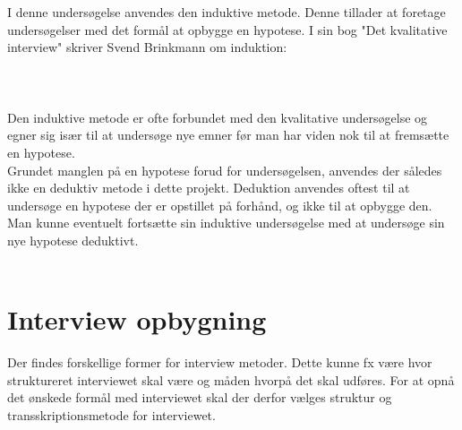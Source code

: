\\
\\ 
I denne undersøgelse anvendes den induktive metode. Denne tillader at foretage undersøgelser med det formål at opbygge en hypotese. 
I sin bog "Det kvalitative interview" skriver Svend Brinkmann om induktion:
\\
\\
 \citep{brinkmann2014}
\\
\\
Den induktive metode er ofte forbundet med den kvalitative undersøgelse og egner sig især til at undersøge nye emner før man har viden nok til at fremsætte en hypotese. 
\\
Grundet manglen på en hypotese forud for undersøgelsen, anvendes der således ikke en deduktiv metode i dette projekt. Deduktion anvendes oftest til at undersøge en hypotese der er opstillet på forhånd, og ikke til at opbygge den. Man kunne eventuelt fortsætte sin induktive undersøgelse med at undersøge sin nye hypotese deduktivt. 
\\
\\



\section{Interview opbygning}
Der findes forskellige former for interview metoder. Dette kunne fx være hvor struktureret interviewet skal være og måden hvorpå det skal udføres. For at opnå det ønskede formål med interviewet skal der derfor vælges struktur og transskriptionsmetode for interviewet.

